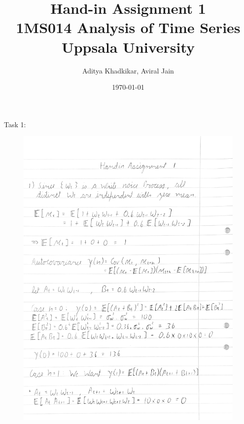 \documentclass[a4paper,11pt]{article}
\title{\textbf{Hand-in Assignment 1} \\ \LARGE 1MS014 Analysis of Time Series \\ \large Uppsala University}
\author{Aditya Khadkikar, Aviral Jain}
\date{\today}
\begin{document}
    \maketitle

    \newpage
    Task 1:    
    \begin{figure}[H]
        \centering
        \includegraphics[width=1\textwidth]{ha-1_files/1-1.png}
        \label{fig:1}
    \end{figure}
\end{document}
